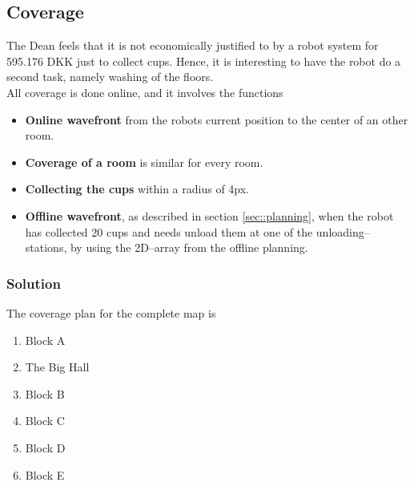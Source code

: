 \subsection{Coverage}
\label{sec::coverage}
The Dean feels that it is not economically justified to by a robot system for 595.176 DKK just to collect cups. Hence, it is interesting to have the robot do a second task, namely washing of the floors.\\[0.2cm]
All coverage is done online, and it involves the functions
\begin{itemize}\itemsep-2pt
\item \textbf{Online wavefront} from the robots current position to the center of an other room.
\item \textbf{Coverage of a room} is similar for every room.
\item \textbf{Collecting the cups} within a radius of 4px.
\item \textbf{Offline wavefront}, as described in section \ref{sec::planning}, when the robot has collected 20 cups and needs unload them at one of the unloading--stations, by using the 2D--array from the offline planning. 
\end{itemize}

\subsubsection{Solution}
The coverage plan for the complete map is
\begin{enumerate}\itemsep-2pt
\item Block A
\item The Big Hall
\item Block B
\item Block C
\item Block D
\item Block E
\end{enumerate}

